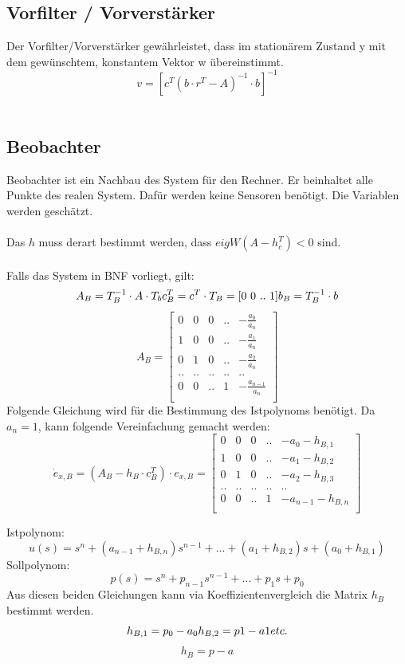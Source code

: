 \subsection{Vorfilter / Vorverstärker}
Der Vorfilter/Vorverstärker gewährleistet, dass im stationärem Zustand y mit dem gewünschtem, konstantem Vektor w übereinstimmt.
\[
	 	v=[c^T(b\cdot r^T-A)^{-1}\cdot b]^{-1}
\]
\\
\subsection{Beobachter}
Beobachter ist ein Nachbau des System für den Rechner. Er beinhaltet alle Punkte des realen System. Dafür werden keine Sensoren benötigt. Die Variablen werden geschätzt.\\
\\
Das $h$ muss derart bestimmt werden, dass $eigW(A-h_c^T)<0$ sind.\\
\\
Falls das System in BNF vorliegt, gilt:
\[
	A_B=T_B^{-1}\cdot A \cdot T_b	\\	c_B^T=c^T\cdot T_B = [0 \ 0 \ .. \  1]	\\	b_B=T_B^{-1}\cdot b
\]
\[
	A_B= \begin{bmatrix}
				0 &	0 & 0 & .. & -\frac{a_0}{a_n}\\
				1 & 0 & 0 & .. & -\frac{a_1}{a_n}\\
				0 & 1 & 0 & .. & -\frac{a_2}{a_n}\\
				.. & .. & .. &.. & .. \\
				0 & 0 & .. & 1 &-\frac{a_{n-1}}{a_n}\\	
			\end{bmatrix}
\]
Folgende Gleichung wird für die Bestimmung des Istpolynoms benötigt. Da $a_n=1$, kann folgende Vereinfachung gemacht werden:
\[
	\dot{e}_{x,B}=(A_B-h_B\cdot c_B^T)\cdot e_{x,B}=
	\begin{bmatrix}
					0 &	0 & 0 & .. & -a_0-h_{B,1}\\
					1 & 0 & 0 & .. & -a_1-h_{B,2}\\
					0 & 1 & 0 & .. & -a_2-h_{B,3}\\
					.. & .. & .. &.. & .. \\
					0 & 0 & .. & 1 &-a_{n-1}-h_{B,n}\\	
				\end{bmatrix}
\]

Istpolynom:
\[
	u(s)=s^n+(a_{n-1}+h_{B,n})s^{n-1}+...+(a_1+h_{B,2})s+(a_0+h_{B,1})
\]
Sollpolynom:
\[
	p(s)=s^n+p_{n-1}s^{n-1}+...+p_1 s+p_0
\]
Aus diesen beiden Gleichungen kann via Koeffizientenvergleich die Matrix $h_B$ bestimmt werden.
\[
	h_{B,1}=p_0-a_0	\\	h_{B,2}=p1-a1	\\	etc.	
\]
\[
	h_B=p-a
\]